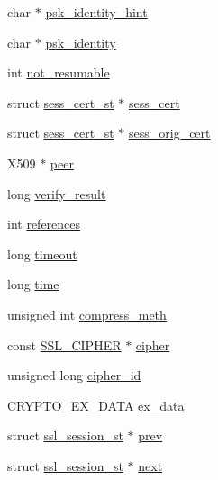 \begin{DoxyCompactItemize}
\item 
char $\ast$ \hyperlink{structssl__session__st_a41b456bc4b62a3c246372c264b380f92}{psk\-\_\-identity\-\_\-hint}
\item 
char $\ast$ \hyperlink{structssl__session__st_a3dce1596980f30431f28a87db7a4161e}{psk\-\_\-identity}
\item 
int \hyperlink{structssl__session__st_a1b4d198b4cf95c73b1e73b06cf521bac}{not\-\_\-resumable}
\item 
struct \hyperlink{structsess__cert__st}{sess\-\_\-cert\-\_\-st} $\ast$ \hyperlink{structssl__session__st_abd0e4711818e1c3373870f0e09d718be}{sess\-\_\-cert}
\item 
struct \hyperlink{structsess__cert__st}{sess\-\_\-cert\-\_\-st} $\ast$ \hyperlink{structssl__session__st_a3646a4d863a55303ac5ef25ac3359442}{sess\-\_\-orig\-\_\-cert}
\item 
X509 $\ast$ \hyperlink{structssl__session__st_a925bea83587ffedbbdb4aa386b75a2d7}{peer}
\item 
long \hyperlink{structssl__session__st_a448769f219815a3a49b726d5ab288783}{verify\-\_\-result}
\item 
int \hyperlink{structssl__session__st_a1b4fccb7a3ccf9f1521896f8bc900801}{references}
\item 
long \hyperlink{structssl__session__st_a69db42a9260a726806b5f6f92923c90b}{timeout}
\item 
long \hyperlink{structssl__session__st_a3d937bd7a9800a780483e4e45033406b}{time}
\item 
unsigned int \hyperlink{structssl__session__st_a2da44d606e0a955ab8f930c2def1ba45}{compress\-\_\-meth}
\item 
const \hyperlink{ssl_8h_a548d7a5d565a9e0e9bd45c49f8c95701}{S\-S\-L\-\_\-\-C\-I\-P\-H\-E\-R} $\ast$ \hyperlink{structssl__session__st_ad28c676df9d108256549b35af21488ea}{cipher}
\item 
unsigned long \hyperlink{structssl__session__st_a8701f3c1016dda3c59248560eaaddeb6}{cipher\-\_\-id}
\item 
C\-R\-Y\-P\-T\-O\-\_\-\-E\-X\-\_\-\-D\-A\-T\-A \hyperlink{structssl__session__st_a1a25c1960884dde3163cc9f98ec942fe}{ex\-\_\-data}
\item 
struct \hyperlink{structssl__session__st}{ssl\-\_\-session\-\_\-st} $\ast$ \hyperlink{structssl__session__st_a3fa9d04e95c8c04a1ef6b6d87d69fed8}{prev}
\item 
struct \hyperlink{structssl__session__st}{ssl\-\_\-session\-\_\-st} $\ast$ \hyperlink{structssl__session__st_accaac56bcf65fe7626e21071e3253d0e}{next}

\end{DoxyCompactItemize}
